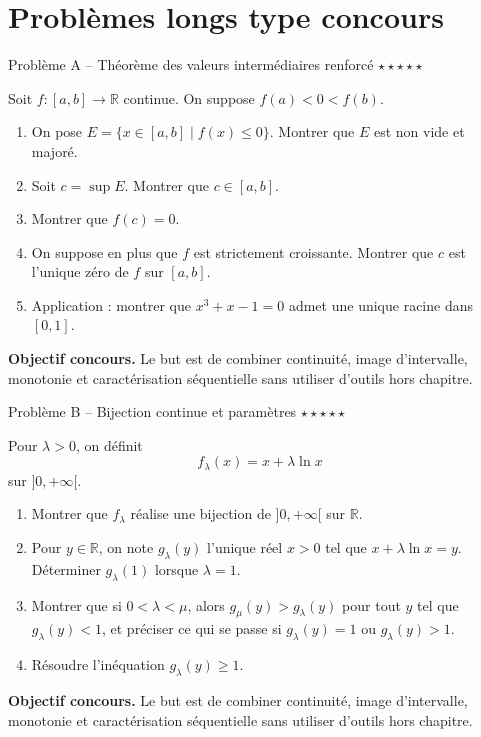 \documentclass[11pt,a4paper]{article}
\newcommand{\etoiles}[1]{\hfill\textcolor{orangeprepa}{\textbf{#1}}}
\newcommand{\R}{\mathbb{R}}
\begin{document}
\section{Problèmes longs type concours}
\begin{problembox}{Problème A -- Théorème des valeurs intermédiaires renforcé \etoiles{$\star\star\star\star\star$}}

Soit $f:[a,b]\to\R$ continue. On suppose $f(a)<0<f(b)$.
\begin{enumerate}
\item On pose $E=\{x\in[a,b]\mid f(x)\leq0\}$. Montrer que $E$ est non vide et majoré.
\item Soit $c=\sup E$. Montrer que $c\in[a,b]$.
\item Montrer que $f(c)=0$.
\item On suppose en plus que $f$ est strictement croissante. Montrer que $c$ est l'unique zéro de $f$ sur $[a,b]$.
\item Application : montrer que $x^3+x-1=0$ admet une unique racine dans $[0,1]$.
\end{enumerate}

\medskip
\textbf{Objectif concours.} Le but est de combiner continuité, image d'intervalle, monotonie et caractérisation séquentielle sans utiliser d'outils hors chapitre.
\end{problembox}
\begin{problembox}{Problème B -- Bijection continue et paramètres \etoiles{$\star\star\star\star\star$}}

Pour $\lambda>0$, on définit
\[
f_\lambda(x)=x+\lambda\ln x
\]
sur $]0,+\infty[$.
\begin{enumerate}
\item Montrer que $f_\lambda$ réalise une bijection de $]0,+\infty[$ sur $\R$.
\item Pour $y\in\R$, on note $g_\lambda(y)$ l'unique réel $x>0$ tel que $x+\lambda\ln x=y$. Déterminer $g_\lambda(1)$ lorsque $\lambda=1$.
\item Montrer que si $0<\lambda<\mu$, alors $g_\mu(y)>g_\lambda(y)$ pour tout $y$ tel que $g_\lambda(y)<1$, et préciser ce qui se passe si $g_\lambda(y)=1$ ou $g_\lambda(y)>1$.
\item Résoudre l'inéquation $g_\lambda(y)\geq1$.
\end{enumerate}

\medskip
\textbf{Objectif concours.} Le but est de combiner continuité, image d'intervalle, monotonie et caractérisation séquentielle sans utiliser d'outils hors chapitre.
\end{problembox}
\end{document}
